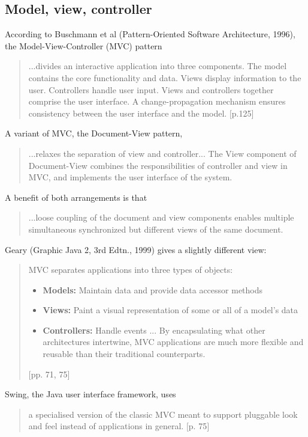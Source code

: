 \subsection{Model, view, controller}

\label{f0:mvc}
According to Buschmann et al
(Pattern-Oriented Software Architecture, 1996),
the Model-View-Controller (MVC)
pattern 
\begin{quotation} 
...divides an interactive application into three components. The model
contains the core functionality and data. Views display information to the
user. Controllers handle user input. Views and controllers together comprise
the user interface. A change-propagation mechanism ensures consistency between
the user interface and the model. \mbox{$[$}p.125\mbox{$]$}\end{quotation}
A variant of MVC, the Document-View pattern, 
\begin{quotation} 
...relaxes the separation of view and controller... The View component of
Document-View combines the responsibilities of controller and view in MVC, and
implements the user interface of the system.\end{quotation}
A benefit of both arrangements is that 
\begin{quotation} 
...loose coupling of the document and view components enables multiple
simultaneous synchronized but different views of the same document.\end{quotation}

Geary (Graphic Java 2, 3rd Edtn., 1999) gives a slightly different view:
\begin{quotation} 
MVC separates applications into three types of objects:
\begin{itemize}
\item 
{\bf Models:} Maintain data and provide data accessor methods
\item 
{\bf Views:} Paint a visual representation of some or all of a model's data
\item 
{\bf Controllers:} Handle events
... By encapsulating what other architectures intertwine, MVC applications are
much more flexible and reusable than their traditional counterparts.
\end{itemize}
\mbox{$[$}pp. 71, 75\mbox{$]$}\end{quotation}
Swing, the Java user interface framework, uses
\begin{quotation} 
a specialised version of the classic MVC meant to support pluggable look and
feel instead of applications in general.
\mbox{$[$}p. 75\mbox{$]$}\end{quotation}

